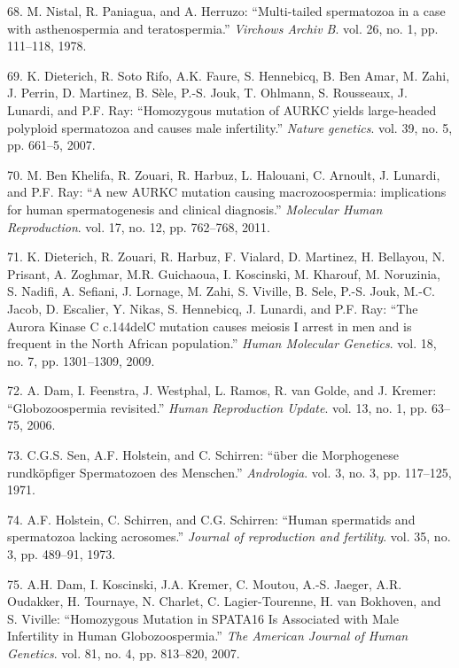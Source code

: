 \documentclass[12pt,a4paper,twoside]{ugathesis}
\theoremstyle{definition}
\theoremstyle{definition}
\theoremstyle{definition}
\theoremstyle{remark}
\begin{document}
\hypertarget{ref-Nistal}{}
68. M. Nistal, R. Paniagua, and A. Herruzo: ``Multi-tailed spermatozoa
in a case with asthenospermia and teratospermia.'' \emph{Virchows Archiv
B}. vol. 26, no. 1, pp. 111--118, 1978.

\hypertarget{ref-Dieterich2007}{}
69. K. Dieterich, R. Soto Rifo, A.K. Faure, S. Hennebicq, B. Ben Amar,
M. Zahi, J. Perrin, D. Martinez, B. Sèle, P.-S. Jouk, T. Ohlmann, S.
Rousseaux, J. Lunardi, and P.F. Ray: ``Homozygous mutation of AURKC
yields large-headed polyploid spermatozoa and causes male infertility.''
\emph{Nature genetics}. vol. 39, no. 5, pp. 661--5, 2007.

\hypertarget{ref-BenKhelifa2011}{}
70. M. Ben Khelifa, R. Zouari, R. Harbuz, L. Halouani, C. Arnoult, J.
Lunardi, and P.F. Ray: ``A new AURKC mutation causing macrozoospermia:
implications for human spermatogenesis and clinical diagnosis.''
\emph{Molecular Human Reproduction}. vol. 17, no. 12, pp. 762--768,
2011.

\hypertarget{ref-Dieterich2009}{}
71. K. Dieterich, R. Zouari, R. Harbuz, F. Vialard, D. Martinez, H.
Bellayou, N. Prisant, A. Zoghmar, M.R. Guichaoua, I. Koscinski, M.
Kharouf, M. Noruzinia, S. Nadifi, A. Sefiani, J. Lornage, M. Zahi, S.
Viville, B. Sele, P.-S. Jouk, M.-C. Jacob, D. Escalier, Y. Nikas, S.
Hennebicq, J. Lunardi, and P.F. Ray: ``The Aurora Kinase C c.144delC
mutation causes meiosis I arrest in men and is frequent in the North
African population.'' \emph{Human Molecular Genetics}. vol. 18, no. 7,
pp. 1301--1309, 2009.

\hypertarget{ref-Dam2006}{}
72. A. Dam, I. Feenstra, J. Westphal, L. Ramos, R. van Golde, and J.
Kremer: ``Globozoospermia revisited.'' \emph{Human Reproduction Update}.
vol. 13, no. 1, pp. 63--75, 2006.

\hypertarget{ref-Sen2009}{}
73. C.G.S. Sen, A.F. Holstein, and C. Schirren: ``über die Morphogenese
rundköpfiger Spermatozoen des Menschen.'' \emph{Andrologia}. vol. 3, no.
3, pp. 117--125, 1971.

\hypertarget{ref-Holstein1973}{}
74. A.F. Holstein, C. Schirren, and C.G. Schirren: ``Human spermatids
and spermatozoa lacking acrosomes.'' \emph{Journal of reproduction and
fertility}. vol. 35, no. 3, pp. 489--91, 1973.

\hypertarget{ref-Dam2007a}{}
75. A.H. Dam, I. Koscinski, J.A. Kremer, C. Moutou, A.-S. Jaeger, A.R.
Oudakker, H. Tournaye, N. Charlet, C. Lagier-Tourenne, H. van Bokhoven,
and S. Viville: ``Homozygous Mutation in SPATA16 Is Associated with Male
Infertility in Human Globozoospermia.'' \emph{The American Journal of
Human Genetics}. vol. 81, no. 4, pp. 813--820, 2007.
\end{document}
